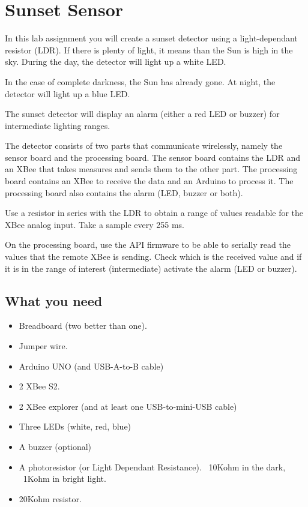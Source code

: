 \chapter{Sunset Sensor}

In this lab assignment you will create a sunset detector using a light-dependant resistor (LDR).
If there is plenty of light, it means than the Sun is high in the sky.
During the day, the detector will light up a white LED.

In the case of complete darkness, the Sun has already gone.
At night, the detector will light up a blue LED.

The sunset detector will display an alarm (either a red LED or buzzer) for intermediate lighting ranges.

The detector consists of two parts that communicate wirelessly, namely the sensor board and the processing board.
The sensor board contains the LDR and an XBee that takes measures and sends them to the other part.
The processing board contains an XBee to receive the data and an Arduino to process it.
The processing board also contains the alarm (LED, buzzer or both).

Use a resistor in series with the LDR to obtain a range of values readable for the XBee analog input.
Take a sample every 255 ms.

On the processing board, use the API firmware to be able to serially read the values that the remote XBee is sending.
Check which is the received value and if it is in the range of interest (intermediate) activate the alarm (LED or buzzer).

\section{What you need}

\begin{itemize}
\item Breadboard (two better than one).
\item Jumper wire.
\item Arduino UNO (and USB-A-to-B cable)
\item 2 XBee S2.
\item 2 XBee explorer (and at least one USB-to-mini-USB cable)
\item Three LEDs (white, red, blue)
\item A buzzer (optional)
\item A photoresistor (or Light Dependant Resistance). ~10Kohm in the dark, ~1Kohm in bright light.
\item 20Kohm resistor.
\end{itemize}

